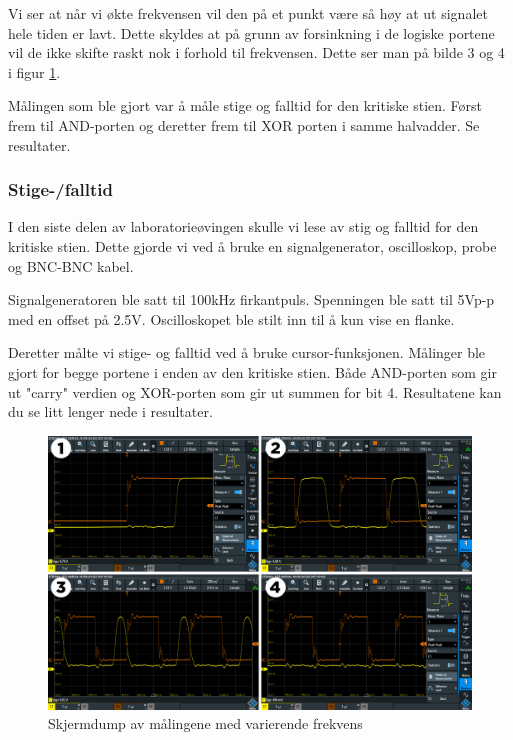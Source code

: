 \documentclass{article}
\begin{document}
Vi ser at når vi økte frekvensen vil den på et punkt være så høy at ut signalet hele tiden er lavt. Dette skyldes at på grunn av forsinkning i de logiske portene vil de ikke skifte raskt nok i forhold til frekvensen. Dette ser man på bilde 3 og 4 i figur \ref{fig:tegneserie1}.

Målingen som ble gjort var å måle stige og falltid for den kritiske stien. Først frem til AND-porten og deretter frem til XOR porten i samme halvadder. Se resultater.


\subsubsection{Stige-/falltid}
I den siste delen av laboratorieøvingen skulle vi lese av stig og falltid for den kritiske stien. Dette gjorde vi ved å bruke en signalgenerator, oscilloskop, probe og BNC-BNC kabel.

Signalgeneratoren ble satt til 100kHz firkantpuls. Spenningen ble satt til 5Vp-p med en offset på 2.5V.  Oscilloskopet ble stilt inn til å kun vise en flanke.

Deretter målte vi stige- og falltid ved å bruke cursor-funksjonen. Målinger ble gjort for begge portene i enden av den kritiske stien. Både AND-porten som gir ut "carry" verdien og XOR-porten som gir ut summen for bit 4. Resultatene kan du se litt lenger nede i resultater.

\begin{figure}[t]
	\centering
	\includegraphics[width=1\linewidth]{tegneserie1}
	\caption{Skjermdump av målingene med varierende frekvens}
	\label{fig:tegneserie1}
\end{figure}


\newpage
\newpage
\end{document}
